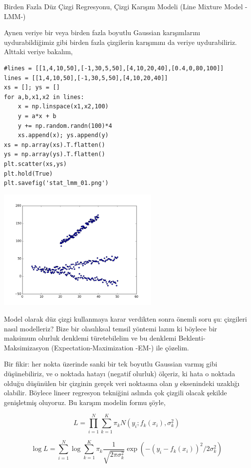 \documentclass[12pt,fleqn]{article}\usepackage{../../common}
\begin{document}
Birden Fazla Düz Çizgi Regresyonu, Çizgi Karışım Modeli (Line Mixture Model -LMM-)

Aynen veriye bir veya birden fazla boyutlu Gaussian karışımlarını
uydurabildiğimiz gibi birden fazla çizgilerin karışımını da veriye
uydurabiliriz. Alttaki veriye bakalım,

\begin{verbatim}
#lines = [[1,4,10,50],[-1,30,5,50],[4,10,20,40],[0.4,0,80,100]]
lines = [[1,4,10,50],[-1,30,5,50],[4,10,20,40]]
xs = []; ys = []
for a,b,x1,x2 in lines:
    x = np.linspace(x1,x2,100)
    y = a*x + b
    y += np.random.randn(100)*4
    xs.append(x); ys.append(y)
xs = np.array(xs).T.flatten()
ys = np.array(ys).T.flatten()
plt.scatter(xs,ys)
plt.hold(True)
plt.savefig('stat_lmm_01.png')
\end{verbatim}

\includegraphics[height=6cm]{stat_lmm_01.png}

Model olarak düz çizgi kullanmaya karar verdikten sonra önemli soru şu:
çizgileri nasıl modelleriz? Bize bir olasılıksal temsil yöntemi lazım ki
böylece bir maksimum olurluk denklemi türetebilelim ve bu denklemi
Beklenti-Maksimizasyon (Expectation-Maximization -EM-) ile çözelim.

Bir fikir: her nokta üzerinde sanki bir tek boyutlu Gaussian varmış gibi
düşünebiliriz, ve o noktada hatayı (negatif olurluk) ölçeriz, ki hata o
noktada olduğu düşünülen bir çizginin gerçek veri noktasına olan $y$
eksenindeki uzaklığı olabilir. Böylece lineer regresyon tekniğini aslında
çok çizgili olacak şekilde genişletmiş oluyoruz. Bu karışım modelin formu
şöyle,


$$ 
L = \prod _{i=1}^{N} \sum _{k=1}^{K} \pi_k N(y_i; f_k(x_i),\sigma_k^2)
$$

$$ \log L = \sum _{i=1}^{N} \log \sum _{k=1}^{K} \pi_k 
\frac{1}{\sqrt{2\pi\sigma_k^2}} \exp (-(y_i-f_k(x_i))^2 / 2\sigma_k^2)
$$
\end{document}
